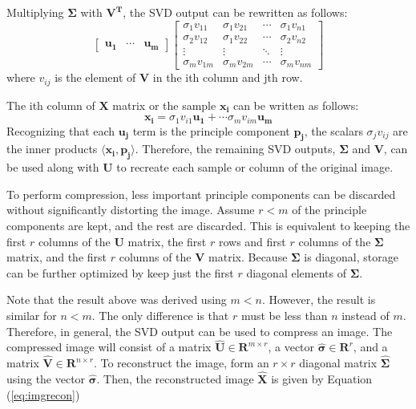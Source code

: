 \documentclass[conference]{IEEEtran}
\begin{document}
    Multiplying $\mathbf{\Sigma}$ with $\mathbf{V^T}$, the SVD output can be rewritten as follows:
	\begin{equation}
		\begin{bmatrix}
			\mathbf{u_1} & \cdots & \mathbf{u_m}
		\end{bmatrix}\begin{bmatrix}
			\sigma_1v_{11} & \sigma_1v_{21} & \cdots & \sigma_1v_{n1}\\
			\sigma_2v_{12} & \sigma_1v_{22} & \cdots & \sigma_2v_{n2}\\
			\vdots & \vdots & \ddots & \vdots\\
			\sigma_mv_{1m} & \sigma_mv_{2m} & \cdots & \sigma_mv_{nm}
		\end{bmatrix}
	\end{equation}
    	where $v_{ij}$ is the element of $\mathbf{V}$ in the ith column and jth row.
    	
    	The ith column of $\mathbf{X}$ matrix or the sample $\mathbf{x_i}$ can be written as follows:
	\begin{equation*}
		\mathbf{x_i} = \sigma_1v_{i1}\mathbf{u_1} + \cdots \sigma_mv_{im}\mathbf{u_m}
	\end{equation*}   	
    Recognizing that each $\mathbf{u_j}$ term is the principle component $\mathbf{p_j}$, the scalars $\sigma_jv_{ij}$ are the inner products $\langle \mathbf{x_i}, \mathbf{p_j}\rangle$. Therefore, the remaining SVD outputs, $\mathbf{\Sigma}$ and $\mathbf{V}$, can be used along with $\mathbf{U}$ to recreate each sample or column of the original image.  
    	
    To perform compression, less important principle components can be discarded without significantly distorting the image.  Assume $r < m$ of the principle components are kept, and the rest are discarded. This is equivalent to keeping the first $r$ columns of the $\mathbf{U}$ matrix, the first $r$ rows and first $r$ columns of the $\mathbf{\Sigma}$ matrix, and the first $r$ columns of the $\mathbf{V}$ matrix. Because $\mathbf{\Sigma}$ is diagonal, storage can be further optimized by keep just the first $r$ diagonal elements of $\mathbf{\Sigma}$.
    	
    Note that the result above was derived using $m < n$. However, the result is similar for $n < m$. The only difference is that $r$ must be less than $n$ instead of $m$. Therefore, in general, the SVD output can be used to compress an image. The compressed image will consist of a matrix $\mathbf{\hat{U}} \in \mathbf{R}^{m \times r}$, a vector $\mathbf{\hat{\sigma}} \in \mathbf{R}^{r}$, and a matrix $\mathbf{\hat{V}} \in \mathbf{R}^{n \times r}$. To reconstruct the image, form an $r \times r$ diagonal matrix $\mathbf{\hat{\Sigma}}$ using the vector $\mathbf{\hat{\sigma}}$. Then, the reconstructed image $\mathbf{\hat{X}}$ is given by Equation (\ref{eq:imgrecon})
\end{document}
